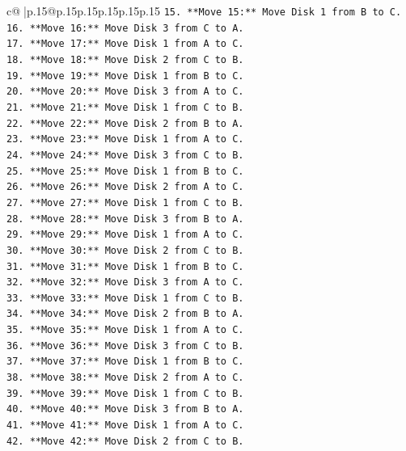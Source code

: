 \documentclass{article}
\begin{document}
{\begin{supertabular}{c@{$\;$}|p{.15\linewidth}@{}p{.15\linewidth}p{.15\linewidth}p{.15\linewidth}p{.15\linewidth}p{.15\linewidth}}
{{{\texttt{15. **Move 15:** Move Disk 1 from B to C.} \\
\texttt{16. **Move 16:** Move Disk 3 from C to A.} \\
\texttt{17. **Move 17:** Move Disk 1 from A to C.} \\
\texttt{18. **Move 18:** Move Disk 2 from C to B.} \\
\texttt{19. **Move 19:** Move Disk 1 from B to C.} \\
\texttt{20. **Move 20:** Move Disk 3 from A to C.} \\
\texttt{21. **Move 21:** Move Disk 1 from C to B.} \\
\texttt{22. **Move 22:** Move Disk 2 from B to A.} \\
\texttt{23. **Move 23:** Move Disk 1 from A to C.} \\
\texttt{24. **Move 24:** Move Disk 3 from C to B.} \\
\texttt{25. **Move 25:** Move Disk 1 from B to C.} \\
\texttt{26. **Move 26:** Move Disk 2 from A to C.} \\
\texttt{27. **Move 27:** Move Disk 1 from C to B.} \\
\texttt{28. **Move 28:** Move Disk 3 from B to A.} \\
\texttt{29. **Move 29:** Move Disk 1 from A to C.} \\
\texttt{30. **Move 30:** Move Disk 2 from C to B.} \\
\texttt{31. **Move 31:** Move Disk 1 from B to C.} \\
\texttt{32. **Move 32:** Move Disk 3 from A to C.} \\
\texttt{33. **Move 33:** Move Disk 1 from C to B.} \\
\texttt{34. **Move 34:** Move Disk 2 from B to A.} \\
\texttt{35. **Move 35:** Move Disk 1 from A to C.} \\
\texttt{36. **Move 36:** Move Disk 3 from C to B.} \\
\texttt{37. **Move 37:** Move Disk 1 from B to C.} \\
\texttt{38. **Move 38:** Move Disk 2 from A to C.} \\
\texttt{39. **Move 39:** Move Disk 1 from C to B.} \\
\texttt{40. **Move 40:** Move Disk 3 from B to A.} \\
\texttt{41. **Move 41:** Move Disk 1 from A to C.} \\
\texttt{42. **Move 42:** Move Disk 2 from C to B.} \\
}}}
\end{supertabular}}
\end{document}
